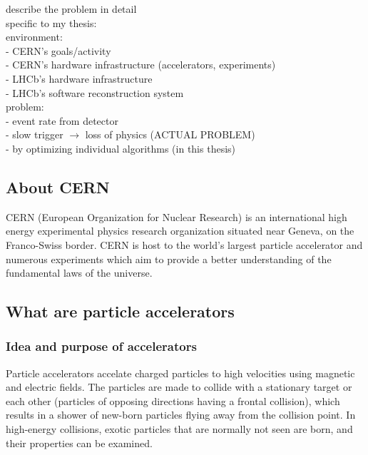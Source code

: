 \documentclass[12pt]{article}
\begin{document}
\color{red}
describe the problem in detail \\
specific to my thesis: \\
environment: \\
- CERN's goals/activity \\
- CERN's hardware infrastructure (accelerators, experiments) \\
- LHCb's hardware infrastructure \\
- LHCb's software reconstruction system \\
problem: \\
- event rate from detector \\
- slow trigger $\rightarrow$ loss of physics (ACTUAL PROBLEM) \\
- by optimizing individual algorithms (in this thesis) \\
\color{black}
\vspace{1.5pc}


\subsection{About CERN}\label{sec_about_cern}

CERN (European Organization for Nuclear Research) is an international high energy experimental physics research organization situated near Geneva, on the Franco-Swiss border. CERN is host to the world's largest particle accelerator and numerous experiments which aim to provide a better understanding of the fundamental laws of the universe.
\cite{cern_about}


\subsection{What are particle accelerators}\label{sec_part_accel_intro}

\subsubsection{Idea and purpose of accelerators}\label{sec_part_accel_idea}

Particle accelerators accelate charged particles to high velocities using magnetic and electric fields. The particles are made to collide with a stationary target or each other (particles of opposing directions having a frontal collision), which results in a shower of new-born particles flying away from the collision point. In high-energy collisions, exotic particles that are normally not seen are born, and their properties can be examined.
\end{document}
